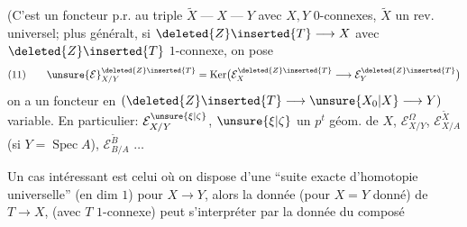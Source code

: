 
(C'est un foncteur p.r. au triple $\widetilde X\mathrel{\text{---}}X\mathrel{\text{---}}Y$ avec $X,Y$ $0$-connexes, $\widetilde X$ un rev. universel; plus généralt, si $\deleted{Z}\inserted{T}\longrightarrow X$ avec $\deleted{Z}\inserted{T}$ $1$-connexe, on pose
\[
(11)\qquad \unsure{\mathcal E}_{X/Y}^{\deleted{Z}\inserted{T}}=\operatorname{Ker}\bigl(\mathcal E_X^{\deleted{Z}\inserted{T}}\longrightarrow\mathcal E_Y^{\deleted{Z}\inserted{T}}\bigr)
\]
on a un foncteur en  $(\deleted{Z}\inserted{T}\longrightarrow\unsure{X_0|X}\longrightarrow Y)$ variable. En particulier: $\mathcal E_{X/Y}^{\unsure{\xi|\zeta}}$, $\unsure{\xi|\zeta}$ un $p^t$ géom. de $X$, $\mathcal E_{X/Y}^{\Omega}$, $\mathcal E_{X/A}^{\widetilde X}$ (si $Y=\operatorname{Spec} A$), $\mathcal E_{B/A}^{\widetilde B}$ $\ldots$


Un cas intéressant est celui où on dispose d'une ``suite exacte d'homotopie universelle''  (en dim $1$) pour $X\longrightarrow Y$, alors la donnée (pour $X=Y$ donné) de $T\longrightarrow X$, (avec $T$ $1$-connexe) peut s'interpréter par la donnée du composé

